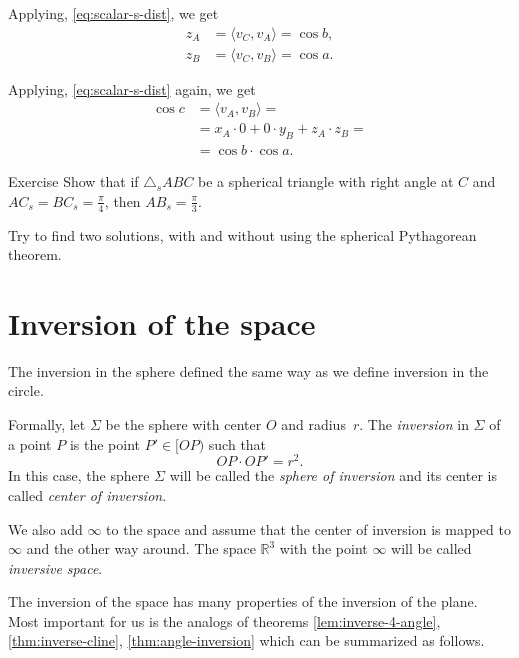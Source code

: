 Applying, \ref{eq:scalar-s-dist},
we get
\begin{align*}
z_A&=\langle v_C,v_A\rangle
=\cos b,
\\
z_B&=\langle v_C,v_B\rangle
=\cos a.
\end{align*}

Applying, \ref{eq:scalar-s-dist} again, we get
\begin{align*}
\cos c &=\langle v_A,v_B\rangle=
\\
&=x_A\cdot 0+0\cdot y_B+z_A\cdot z_B=
\\
&=\cos b\cdot\cos a.
\end{align*}
\qedsf

\begin{thm}{Exercise}\label{ex:2(pi/4)=pi/3}
Show that 
if $\triangle_sABC$ be a spherical triangle with right angle at $C$
and $AC_s=BC_s=\tfrac\pi4$, then $AB_s=\tfrac\pi3$.

Try to find two solutions, with and without using the spherical Pythagorean theorem.
\end{thm}

\section*{Inversion of the space}

The inversion in the sphere defined the same way as we define inversion in the circle.

Formally, let $\Sigma$ be the sphere with center $O$ and radius~$r$.
The \emph{inversion} in $\Sigma$ of a point $P$ is the point $P'\in[OP)$ such that
$$OP\cdot OP'=r^2.$$
In this case, the sphere $\Sigma$  will be called the 
\emph{sphere of inversion} 
and its center is called \emph{center of inversion}.

We also add $\infty$ to the space and assume that the center of inversion is mapped to $\infty$ and the other way around. 
The space $\mathbb{R}^3$ with the point $\infty$ will be called \emph{inversive space}.

The inversion of the space 
has many properties 
of the inversion of the plane.
Most important for us is the analogs of theorems \ref{lem:inverse-4-angle}, \ref{thm:inverse-cline}, \ref{thm:angle-inversion} which can be summarized as follows.


